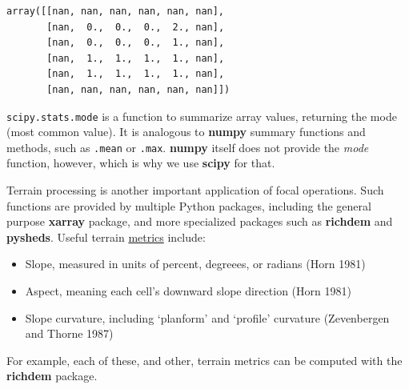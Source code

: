 \documentclass[
  letterpaper,
]{krantz}
\providecommand{\tightlist}{%
  \setlength{\itemsep}{0pt}\setlength{\parskip}{0pt}}\usepackage{longtable,booktabs,array}
\begin{document}
\begin{verbatim}
array([[nan, nan, nan, nan, nan, nan],
       [nan,  0.,  0.,  0.,  2., nan],
       [nan,  0.,  0.,  0.,  1., nan],
       [nan,  1.,  1.,  1.,  1., nan],
       [nan,  1.,  1.,  1.,  1., nan],
       [nan, nan, nan, nan, nan, nan]])
\end{verbatim}

\begin{tcolorbox}[enhanced jigsaw, title=\textcolor{quarto-callout-note-color}{\faInfo}\hspace{0.5em}{Note}, arc=.35mm, toprule=.15mm, titlerule=0mm, colframe=quarto-callout-note-color-frame, breakable, toptitle=1mm, bottomtitle=1mm, rightrule=.15mm, colbacktitle=quarto-callout-note-color!10!white, leftrule=.75mm, left=2mm, bottomrule=.15mm, opacityback=0, coltitle=black, opacitybacktitle=0.6, colback=white]

\texttt{scipy.stats.mode} is a function to summarize array values,
returning the mode (most common value). It is analogous to
\textbf{numpy} summary functions and methods, such as \texttt{.mean} or
\texttt{.max}. \textbf{numpy} itself does not provide the \emph{mode}
function, however, which is why we use \textbf{scipy} for that.

\end{tcolorbox}

Terrain processing is another important application of focal operations.
Such functions are provided by multiple Python packages, including the
general purpose \textbf{xarray} package, and more specialized packages
such as \textbf{richdem} and \textbf{pysheds}. Useful terrain
\href{https://richdem.readthedocs.io/en/latest/python_api.html?highlight=TerrainAttribute\#richdem.TerrainAttribute}{metrics}
include:

\begin{itemize}
\tightlist
\item
  Slope, measured in units of percent, degreees, or radians (Horn 1981)
\item
  Aspect, meaning each cell's downward slope direction (Horn 1981)
\item
  Slope curvature, including `planform' and `profile' curvature
  (Zevenbergen and Thorne 1987)
\end{itemize}

For example, each of these, and other, terrain metrics can be computed
with the \textbf{richdem} package.
\end{document}
